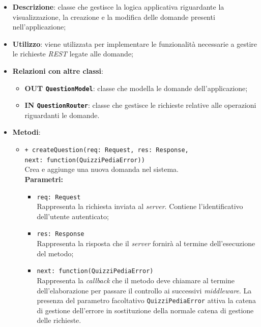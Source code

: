 	\begin{itemize}
		\item \textbf{Descrizione}:
		classe che gestisce la logica applicativa riguardante la visualizzazione, la creazione e la modifica delle domande presenti nell'applicazione;
		\item \textbf{Utilizzo}:
		viene utilizzata per implementare le funzionalità necessarie a gestire le richieste \textit{REST} legate alle domande;
		\item \textbf{Relazioni con altre classi}:
			\begin{itemize}
				\item \textbf{OUT \texttt{QuestionModel}}:
				classe che modella le domande dell'applicazione;
				\item \textbf{IN \texttt{QuestionRouter}}:
				classe che gestisce le richieste relative alle operazioni riguardanti le domande.
			\end{itemize}
		\item \textbf{Metodi}:
			\begin{itemize}
				\item \texttt{+ createQuestion(req: Request, res: Response,\\ next: function(QuizziPediaError))} \\
				Crea e aggiunge una nuova domanda nel sistema. \\
				\textbf{Parametri:}
				\begin{itemize}
					\item \texttt{req: Request} \\
					Rappresenta la richiesta inviata al \textit{server}. Contiene l'identificativo dell'utente autenticato;
					\item \texttt{res: Response} \\
					Rappresenta la risposta che il \textit{server} fornirà al termine dell'esecuzione del metodo;
					\item \texttt{next: function(QuizziPediaError)} \\
					Rappresenta la \textit{callback} che il metodo deve chiamare al termine dell'elaborazione per passare il controllo ai successivi \textit{middleware}. La presenza del parametro facoltativo \texttt{QuizziPediaError} attiva la catena di gestione dell'errore in sostituzione della normale catena di gestione delle richieste.
				\end{itemize}
				

\end{itemize}
\end{itemize}
